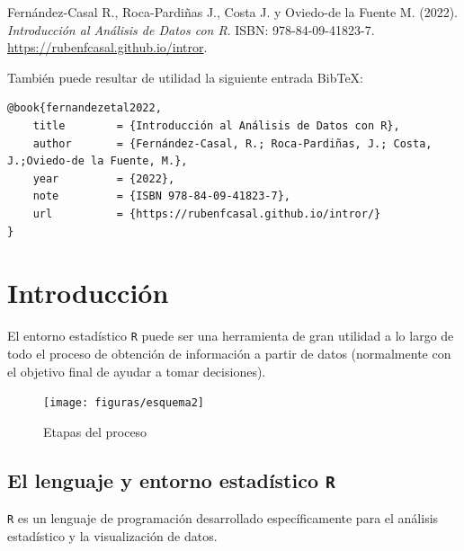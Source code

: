 \documentclass[
]{book}
\theoremstyle{break}
\theoremstyle{nonumberplain}
\begin{document}
Fernández-Casal R., Roca-Pardiñas J., Costa J. y Oviedo-de la Fuente M. (2022). \emph{Introducción al Análisis de Datos con R}. ISBN: 978-84-09-41823-7. \url{https://rubenfcasal.github.io/intror}.

También puede resultar de utilidad la siguiente entrada BibTeX:

\begin{verbatim}
@book{fernandezetal2022,
    title        = {Introducción al Análisis de Datos con R},
    author       = {Fernández-Casal, R.; Roca-Pardiñas, J.; Costa, J.;Oviedo-de la Fuente, M.},
    year         = {2022},
    note         = {ISBN 978-84-09-41823-7},
    url          = {https://rubenfcasal.github.io/intror/}
}
\end{verbatim}

\hypertarget{introducciuxf3n}{%
\chapter{Introducción}\label{introducciuxf3n}}

El entorno estadístico \texttt{R} puede ser una herramienta de gran
utilidad a lo largo de todo el proceso de obtención de información
a partir de datos (normalmente con el objetivo final de ayudar a tomar decisiones).

\begin{figure}[!htb]

{\centering \texttt{[image: figuras/esquema2]} 

}

\caption{Etapas del proceso}\label{fig:esquema}
\end{figure}

\hypertarget{el-lenguaje-y-entorno-estaduxedstico-r}{%
\section{\texorpdfstring{El lenguaje y entorno estadístico \texttt{R}}{El lenguaje y entorno estadístico R}}\label{el-lenguaje-y-entorno-estaduxedstico-r}}

\texttt{R} es un lenguaje de programación desarrollado específicamente para el
análisis estadístico y la visualización de datos.
\end{document}
